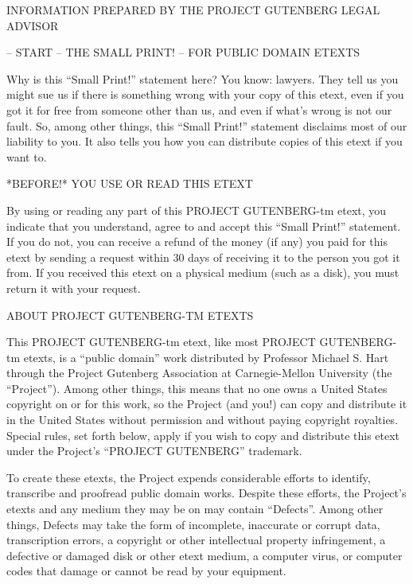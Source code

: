 \documentclass[12pt]{book}
\begin{document}
\newpage

\begin{center}
{\Large INFORMATION PREPARED BY THE PROJECT GUTENBERG LEGAL ADVISOR}
\end{center}


-- START -- THE SMALL PRINT! -- FOR PUBLIC DOMAIN ETEXTS

Why is this ``Small Print!'' statement here?  You know: lawyers.
They tell us you might sue us if there is something wrong with
your copy of this etext, even if you got it for free from
someone other than us, and even if what's wrong is not our
fault.  So, among other things, this ``Small Print!'' statement
disclaims most of our liability to you.  It also tells you how
you can distribute copies of this etext if you want to.

\begin{center}
*BEFORE!* YOU USE OR READ THIS ETEXT
\end{center}

By using or reading any part of this PROJECT GUTENBERG-tm
etext, you indicate that you understand, agree to and accept
this ``Small Print!'' statement.  If you do not, you can receive
a refund of the money (if any) you paid for this etext by
sending a request within 30 days of receiving it to the person
you got it from.  If you received this etext on a physical
medium (such as a disk), you must return it with your request.

\begin{center}
ABOUT PROJECT GUTENBERG-TM ETEXTS
\end{center}

This PROJECT GUTENBERG-tm etext, like most PROJECT GUTEN\-BERG-
tm etexts, is a ``public domain'' work distributed by Professor
Michael S. Hart through the Project Gutenberg Association at
Carnegie-Mellon University (the ``Project'').  Among other
things, this means that no one owns a United States copyright
on or for this work, so the Project (and you!) can copy and
distribute it in the United States without permission and
without paying copyright royalties.  Special rules, set forth
below, apply if you wish to copy and distribute this etext
under the Project's ``PROJECT GUTENBERG'' trademark.

To create these etexts, the Project expends considerable
efforts to identify, transcribe and proofread public domain
works.  Despite these efforts, the Project's etexts and any
medium they may be on may contain ``Defects''.  Among other
things, Defects may take the form of incomplete, inaccurate or
corrupt data, transcription errors, a copyright or other
intellectual property infringement, a defective or damaged
disk or other etext medium, a computer virus, or computer
codes that damage or cannot be read by your equipment.
\end{document}
